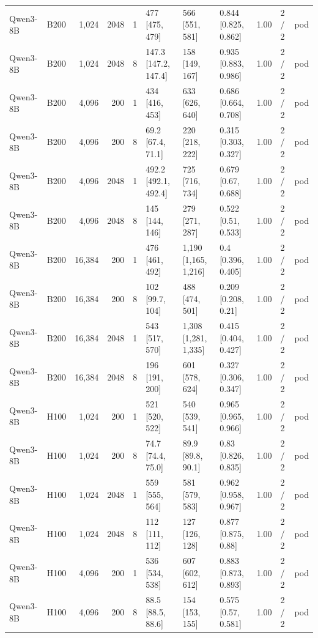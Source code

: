 \begin{landscape}
\begin{longtable}{llrrrlllrll}
Qwen3-8B & B200 & 1,024 & 2048 & 1 & 477 {[}475, 479{]} & 566 {[}551, 581{]} & 0.844 {[}0.825, 0.862{]} & 1.00 & 2 / 2 & pod \\
Qwen3-8B & B200 & 1,024 & 2048 & 8 & 147.3 {[}147.2, 147.4{]} & 158 {[}149, 167{]} & 0.935 {[}0.883, 0.986{]} & 1.00 & 2 / 2 & pod \\
Qwen3-8B & B200 & 4,096 & 200 & 1 & 434 {[}416, 453{]} & 633 {[}626, 640{]} & 0.686 {[}0.664, 0.708{]} & 1.00 & 2 / 2 & pod \\
Qwen3-8B & B200 & 4,096 & 200 & 8 & 69.2 {[}67.4, 71.1{]} & 220 {[}218, 222{]} & 0.315 {[}0.303, 0.327{]} & 1.00 & 2 / 2 & pod \\
Qwen3-8B & B200 & 4,096 & 2048 & 1 & 492.2 {[}492.1, 492.4{]} & 725 {[}716, 734{]} & 0.679 {[}0.67, 0.688{]} & 1.00 & 2 / 2 & pod \\
Qwen3-8B & B200 & 4,096 & 2048 & 8 & 145 {[}144, 146{]} & 279 {[}271, 287{]} & 0.522 {[}0.51, 0.533{]} & 1.00 & 2 / 2 & pod \\
Qwen3-8B & B200 & 16,384 & 200 & 1 & 476 {[}461, 492{]} & 1,190 {[}1,165, 1,216{]} & 0.4 {[}0.396, 0.405{]} & 1.00 & 2 / 2 & pod \\
Qwen3-8B & B200 & 16,384 & 200 & 8 & 102 {[}99.7, 104{]} & 488 {[}474, 501{]} & 0.209 {[}0.208, 0.21{]} & 1.00 & 2 / 2 & pod \\
Qwen3-8B & B200 & 16,384 & 2048 & 1 & 543 {[}517, 570{]} & 1,308 {[}1,281, 1,335{]} & 0.415 {[}0.404, 0.427{]} & 1.00 & 2 / 2 & pod \\
Qwen3-8B & B200 & 16,384 & 2048 & 8 & 196 {[}191, 200{]} & 601 {[}578, 624{]} & 0.327 {[}0.306, 0.347{]} & 1.00 & 2 / 2 & pod \\
Qwen3-8B & H100 & 1,024 & 200 & 1 & 521 {[}520, 522{]} & 540 {[}539, 541{]} & 0.965 {[}0.965, 0.966{]} & 1.00 & 2 / 2 & pod \\
Qwen3-8B & H100 & 1,024 & 200 & 8 & 74.7 {[}74.4, 75.0{]} & 89.9 {[}89.8, 90.1{]} & 0.83 {[}0.826, 0.835{]} & 1.00 & 2 / 2 & pod \\
Qwen3-8B & H100 & 1,024 & 2048 & 1 & 559 {[}555, 564{]} & 581 {[}579, 583{]} & 0.962 {[}0.958, 0.967{]} & 1.00 & 2 / 2 & pod \\
Qwen3-8B & H100 & 1,024 & 2048 & 8 & 112 {[}111, 112{]} & 127 {[}126, 128{]} & 0.877 {[}0.875, 0.88{]} & 1.00 & 2 / 2 & pod \\
Qwen3-8B & H100 & 4,096 & 200 & 1 & 536 {[}534, 538{]} & 607 {[}602, 612{]} & 0.883 {[}0.873, 0.893{]} & 1.00 & 2 / 2 & pod \\
Qwen3-8B & H100 & 4,096 & 200 & 8 & 88.5 {[}88.5, 88.6{]} & 154 {[}153, 155{]} & 0.575 {[}0.57, 0.581{]} & 1.00 & 2 / 2 & pod \\

\end{longtable}
\end{landscape}

